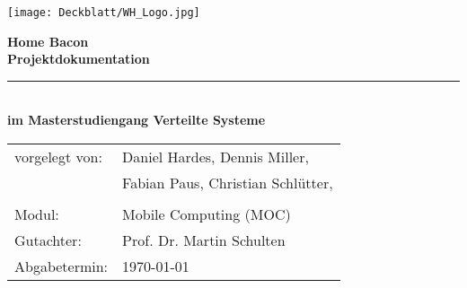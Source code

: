 \thispagestyle{plain}
\begin{titlepage}

\begin{center}

\texttt{[image: Deckblatt/WH\_Logo.jpg]}

\vspace{2cm}

\Huge{\textbf{Home Bacon}}\\[1.5ex]
\Large{\textbf{Projektdokumentation}}
\rule{\textwidth}{0.4pt}\\[3.0ex]

\large{\textbf{im Masterstudiengang Verteilte Systeme}}\\[3.0ex]

\normalsize
\begin{tabular}{ll}\\
	vorgelegt von: 
	& \quad Daniel Hardes,  Dennis Miller, \\[1.2ex]
	& \quad Fabian Paus, Christian Schlütter,\\[1.2ex]
	& \quad \\[1.2ex]
	Modul:  & \quad Mobile Computing (MOC) \\[1.2ex]
	Gutachter:  & \quad Prof. Dr. Martin Schulten \\[1.2ex]
	Abgabetermin:  & \quad \today\\[1.2ex]
\end{tabular}

\end{center}

\end{titlepage}
